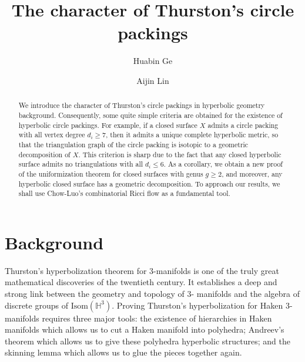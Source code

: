 \documentclass[12pt]{amsart}
\numberwithin{equation}{section}
\begin{document}
\title[The character of Thurston's circle packings]{The character of Thurston's circle packings}

\author{Huabin Ge}
\address{School of Mathematics, Renmin University of China, Beijing 100872, China}

\author{Aijin Lin}
\address{Department of Mathematics, National University of Defense Technology, Changsha 410073, China}

\begin{abstract}
We introduce the character of Thurston's circle packings in hyperbolic geometry background.
Consequently, some quite simple criteria are obtained for the existence of hyperbolic circle packings. For example,
if a closed surface $X$ admits a circle packing with all vertex degree $d_i \geq 7$, then it admits a unique complete
hyperbolic metric, so that the triangulation graph of the circle packing is isotopic to a geometric decomposition
of $X$. This criterion is sharp due to the fact that any closed hyperbolic surface admits no triangulations with
all $d_i \leq 6$. As a corollary, we obtain a new proof of the uniformization theorem for closed surfaces with genus
$g \geq 2$, and moreover, any hyperbolic closed surface has a geometric decomposition. To approach our results, we
shall use Chow-Luo's combinatorial Ricci flow as a fundamental tool.
\end{abstract}


\maketitle

\section{Background}

Thurston's hyperbolization theorem for 3-manifolds is one of the truly great mathematical discoveries of
the twentieth century. It establishes a deep and strong link between the geometry and topology of 3-
manifolds and the algebra of discrete groups of $\mathrm{Isom}(\mathbb{H}^3)$. Proving Thurston's hyperbolization for Haken
3-manifolds requires three major tools: the existence of hierarchies in Haken manifolds which allows us
to cut a Haken manifold into polyhedra; Andreev's theorem which allows us to give these polyhedra
hyperbolic structures; and the skinning lemma which allows us to glue the pieces together again.
\end{document}
